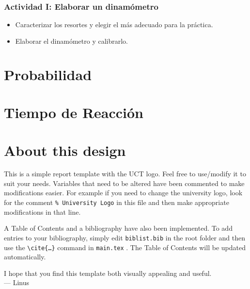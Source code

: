 \documentclass[12pt]{article}
\begin{document}
\subsubsection{Actividad I: Elaborar un dinamómetro}

\begin{itemize}
 \item Caracterizar los resortes y elegir el más adecuado para la práctica.
 \item Elaborar el dinamómetro y calibrarlo.
\end{itemize}






\newpage


\appendix

\section{Probabilidad}
\label{prob}

\section{Tiempo de Reacción}
\label{t_recc}

\section{About this design}
This is a simple report template with the UCT logo. Feel free to use/modify it to suit your needs. Variables that need to be altered have been commented to make modifications easier. For example if you need to change the university logo, look for the comment \texttt{\% University Logo} in this file and then make appropriate modifications in that line.

A Table of Contents and a bibliography have also been implemented. To add entries to your bibliography, simply edit \texttt{biblist.bib} in the root folder and then use the \texttt{\textbackslash cite\{\ldots\}} command in \texttt{main.tex} \cite{bibtex}. The Table of Contents will be updated automatically.

I hope that you find this template both visually appealing and useful. \\

\hspace{1 cm}--- Linus

\newpage





\newpage






\end{document}
